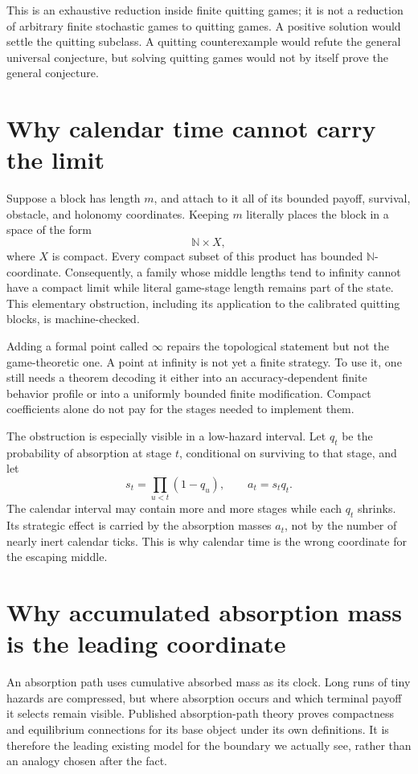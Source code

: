 \documentclass[11pt]{article}
\begin{document}
This is an exhaustive reduction inside finite quitting games; it is not a
reduction of arbitrary finite stochastic games to quitting games.  A positive
solution would settle the quitting subclass.  A quitting counterexample would
refute the general universal conjecture, but solving quitting games would not
by itself prove the general conjecture.

\section{Why calendar time cannot carry the limit}

Suppose a block has length \(m\), and attach to it all of its bounded payoff,
survival, obstacle, and holonomy coordinates.  Keeping \(m\) literally places
the block in a space of the form
\[
  \mathbb{N}\times X,
\]
where \(X\) is compact.  Every compact subset of this product has bounded
\(\mathbb{N}\)-coordinate.  Consequently, a family whose middle lengths tend
to infinity cannot have a compact limit while literal game-stage length
remains part of the state.  This elementary obstruction, including its
application to the calibrated quitting blocks, is machine-checked.

Adding a formal point called \(\infty\) repairs the topological statement but
not the game-theoretic one.  A point at infinity is not yet a finite strategy.
To use it, one still needs a theorem decoding it either into an
accuracy-dependent finite behavior profile or into a uniformly bounded
finite modification.  Compact coefficients alone do not pay for the stages
needed to implement them.

The obstruction is especially visible in a low-hazard interval.  Let \(q_t\)
be the probability of absorption at stage \(t\), conditional on surviving to
that stage, and let
\[
  s_t=\prod_{u<t}(1-q_u),
  \qquad
  a_t=s_tq_t.
\]
The calendar interval may contain more and more stages while each \(q_t\)
shrinks.  Its strategic effect is carried by the absorption masses \(a_t\),
not by the number of nearly inert calendar ticks.  This is why calendar time
is the wrong coordinate for the escaping middle.

\section{Why accumulated absorption mass is the leading coordinate}

An absorption path uses cumulative absorbed mass as its clock.  Long runs of
tiny hazards are compressed, but where absorption occurs and which terminal
payoff it selects remain visible.  Published absorption-path theory proves
compactness and equilibrium connections for its base object under its own
definitions.  It is therefore the leading existing model for the boundary we
actually see, rather than an analogy chosen after the fact.
\end{document}

